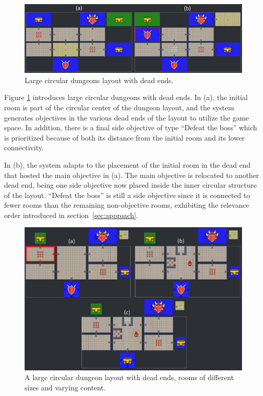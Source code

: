 \begin{figure}[h]
  \centering
  \includegraphics[width=\columnwidth]{included-papers-tex/paper-7/figures/results6.png}
  \caption{Large circular dungeons layout with dead ends.}
  \label{fig:oldfig10}
\end{figure}

Figure \ref{fig:oldfig10} introduces large circular dungeons with dead ends. In (a), the initial room is part of the circular center of the dungeon layout, and the system generates objectives in the various dead ends of the layout to utilize the game space. In addition, there is a final side objective of type “Defeat the boss” which is prioritized because of both its distance from the initial room and its lower connectivity.%

In (b), the system adapts to the placement of the initial room in the dead end that hosted the main objective in (a). The main objective is relocated to another dead end, being one side objective now placed inside the inner circular structure of the layout. “Defeat the boss” is still a side objective since it is connected to fewer rooms than the remaining non-objective rooms, exhibiting the relevance order introduced in section~\ref{sec:approach}.%

\begin{figure}[h]
  \centering
  \includegraphics[width=\columnwidth]{included-papers-tex/paper-7/figures/results7.png}
  \caption{A large circular dungeon layout with dead ends, rooms of different sizes and varying content.}
  \label{fig:oldfig11}
\end{figure}

